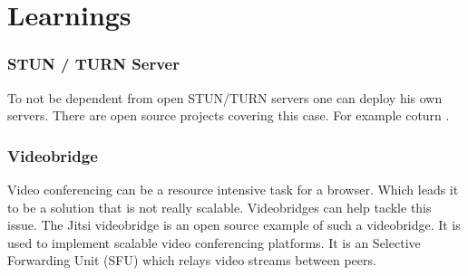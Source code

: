 \clearpage
\chapter{Learnings}

\subsection{STUN / TURN Server}
To not be dependent from open STUN/TURN servers one can deploy his own servers. There are open source projects covering this case. For example coturn \cite{coturn}.

\subsection{Videobridge}
Video conferencing can be a resource intensive task for a browser. Which leads it to be a solution that is not really scalable. Videobridges can help tackle this issue. The Jitsi videobridge is an open source example of such a videobridge. It is used to implement scalable video conferencing platforms. It is an Selective Forwarding Unit (SFU) which relays video streams between peers.
